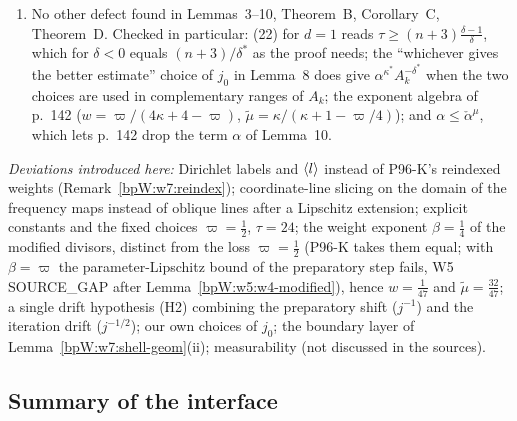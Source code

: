 \begin{remark}
\begin{enumerate}[label=(\alph*)]
  The printed order-$\alpha$ assertion for the unweighted Lipschitz seminorm is not justified by these estimates. The
  proof needs only sufficiently small Lipschitz seminorm, made explicit here by $\theta\le\theta_0$
  (Lemma~\ref{bpW:w7:Xzones}, (C4)); the measure conclusion is retained.
\item No other defect found in Lemmas~3--10, Theorem~B, Corollary~C, Theorem~D. Checked in particular: (22) for
  $d=1$ reads $\tau\ge(n+3)\frac{\delta-1}\delta$, which for $\delta<0$ equals $(n+3)/\delta^*$ as the proof needs; the
  ``whichever gives the better estimate'' choice of $j_0$ in Lemma~8 does give $\alpha^{\kappa^*}A_k^{-\delta^*}$ when the
  two choices are used in complementary ranges of $A_k$; the exponent algebra of p.~142 ($w=\varpi/(4\kappa+4-\varpi)$,
  $\tilde\mu=\kappa/(\kappa+1-\varpi/4)$); and $\alpha\le\check\alpha^\mu$, which lets p.~142 drop the term $\alpha$ of
  Lemma~10.
\end{enumerate}
\emph{Deviations introduced here:} Dirichlet labels and $\langle l\rangle$ instead of P96-K's reindexed weights
(Remark~\ref{bpW:w7:reindex}); coordinate-line slicing on the domain of the frequency maps instead of oblique lines
after a Lipschitz extension; explicit constants and the fixed choices $\varpi=\frac12$, $\tau=24$; the weight exponent $\beta=\frac14$ of the
modified divisors, distinct from the loss $\varpi=\frac12$ (P96-K takes them equal; with $\beta=\varpi$ the
parameter-Lipschitz bound of the preparatory step fails, W5 \textsf{SOURCE\_GAP} after
Lemma~\ref{bpW:w5:w4-modified}), hence $w=\frac1{47}$ and $\tilde\mu=\frac{32}{47}$; a single drift
hypothesis (H2) combining the preparatory shift ($j^{-1}$) and the iteration drift ($j^{-1/2}$); our own choices of
$j_0$; the boundary layer of Lemma~\ref{bpW:w7:shell-geom}(ii); measurability (not discussed in the sources).
\end{remark}

\subsection{Summary of the interface}\label{bpW:w7:summary}


